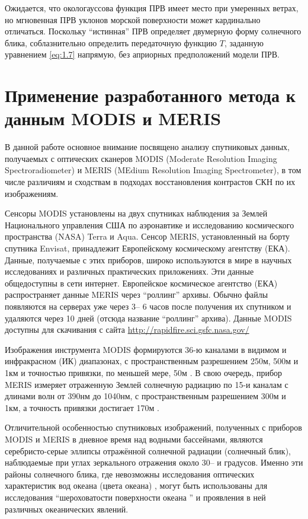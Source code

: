 Ожидается, что окологауссова функция ПРВ имеет место при умеренных ветрах, но мгновенная ПРВ уклонов морской поверхности может кардинально отличаться. Поскольку ``истинная'' ПРВ определяет двумерную форму солнечного блика, соблазнительно определить передаточную функцию $T$, заданную уравнением \eqref{eq:1.7} напрямую, без априорных предположений модели ПРВ.



\newpage

\section{Применение разработанного метода к данным MODIS и MERIS}



В данной работе основное внимание посвящено анализу спутниковых данных, получаемых с оптических сканеров MODIS (Moderate Resolution Imaging Spectroradiometer) и MERIS (MEdium Resolution Imaging Spectrometer), в том числе различиям и сходствам в подходах восстановления контрастов СКН по их изображениям. 

Сенсоры MODIS установлены на двух спутниках наблюдения за Землей Национального управления США по аэронавтике и исследованию космического пространства (NASA) Terra и Aqua. Сенсор MERIS, установленный на борту спутника Envisat, принадлежит Европейскому космическому агентству (ЕКА). Данные, получаемые с этих приборов, широко используются в мире в научных исследованиях и различных практических приложениях. Эти данные общедоступны в сети интернет. Европейское космическое агентство (ЕКА) распространяет данные MERIS через ``роллинг'' архивы. Обычно файлы появляются на серверах уже через 3-- 6 часов после получения их спутником и удаляются через 10 дней (отсюда название ``роллинг'' архива). Данные MODIS доступны для скачивания с сайта \url{http://rapidfire.sci.gsfc.nasa.gov/}

Изображения инструмента MODIS формируются 36-ю каналами в видимом и инфракрасном (ИК) диапазонах, с пространственным разрешением 250м, 500м и 1км и точностью привязки, по меньшей мере, 50м \citep{Salomonson1989, Wolfe2002}. В свою очередь, прибор MERIS измеряет отраженную Землей солнечную радиацию по 15-и каналам с длинами волн от 390нм до 1040нм, с пространственным разрешением 300м и 1км, а точность привязки достигает 170м \citep{Goryl2004}.

Отличительной особенностью спутниковых изображений, полученных с приборов MODIS и MERIS в дневное время над водными бассейнами, являются серебристо-серые эллипсы отражённой солнечной радиации (солнечный блик), наблюдаемые при углах зеркального отражения около 30-- и градусов. Именно эти районы солнечного блика, где невозможны исследования оптических характеристик вод океана (цвета океана) \citep{Esaias1998}, могут быть использованы для исследования ``шероховатости поверхности океана '' и проявления в ней различных океанических явлений. 

